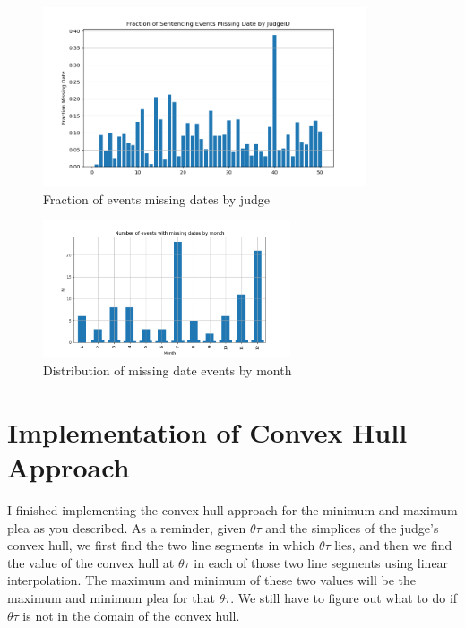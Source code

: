 \documentclass[11pt]{article}
\begin{document}
  \begin{figure}[H]
    \centering
    \includegraphics[width=0.85\textwidth]{../../../output/figures/Exploration/fraction_missing_date_by_JudgeID.png}
    \caption{Fraction of events missing dates by judge}
    \label{fig-frac-missing-judge}
  \end{figure}

  \begin{figure}[H]
    \centering
    \includegraphics[width=0.65\textwidth]{../../../output/figures/Exploration/missing_date_month_hist.png}
    \caption{Distribution of missing date events by month}
    \label{fig-missing-month}
  \end{figure}

\section{Implementation of Convex Hull Approach}
  I finished implementing the convex hull approach for the minimum and maximum plea as you described. As a reminder, given $\theta \tau$ and the simplices of the judge's convex hull, we first find the two line segments in which $\theta \tau$ lies, and then we find the value of the convex hull at $\theta \tau$ in each of those two line segments using linear interpolation. The maximum and minimum of these two values will be the maximum and minimum plea for that $\theta \tau$.
  We still have to figure out what to do if $\theta \tau$ is not in the domain of the convex hull.
\end{document}

